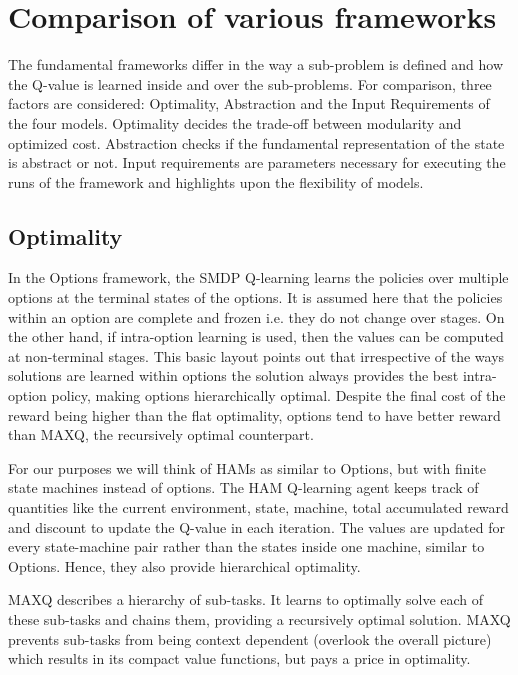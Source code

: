 \section{Comparison of various frameworks}

The fundamental frameworks differ in the way a sub-problem is defined and how the Q-value is learned inside and over the sub-problems. For comparison, three factors are considered: Optimality, Abstraction and the Input Requirements of the four models. Optimality decides the trade-off between modularity and optimized cost. Abstraction checks if the fundamental representation of the state is abstract or not. Input requirements are parameters necessary for executing the runs of the framework and highlights upon the flexibility of models.

\subsection{Optimality}

In the Options framework, the SMDP Q-learning learns the policies over multiple options at the terminal states of the options. It is assumed here that the policies within an option are complete and frozen i.e. they do not change over stages. On the other hand, if intra-option learning is used, then the values can be computed at non-terminal stages. This basic layout points out that irrespective of the ways solutions are learned within options the solution always provides the best intra-option policy, making options hierarchically optimal. Despite the final cost of the reward being higher than the flat optimality, options tend to have better reward than MAXQ, the recursively optimal counterpart.

For our purposes we will think of HAMs as similar to Options, but with finite state machines instead of options. The HAM Q-learning agent keeps track of quantities like the current environment, state, machine, total accumulated reward and discount to update the Q-value in each iteration. The values are updated for every state-machine pair rather than the states inside one machine, similar to Options. Hence, they also provide hierarchical optimality.

MAXQ describes a hierarchy of sub-tasks. It learns to optimally solve each of these sub-tasks and chains them, providing a recursively optimal solution. MAXQ prevents sub-tasks from being context dependent (overlook the overall picture) which results in its compact value functions, but pays a price in optimality.


